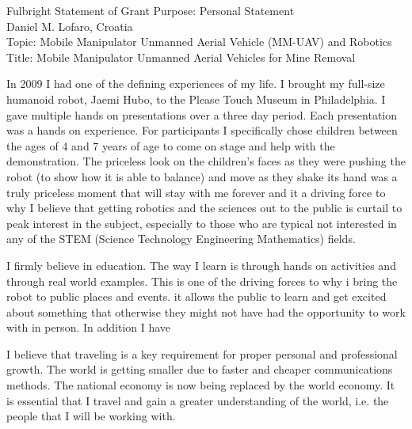 \documentclass[12pt]{article}
\begin{document}
\begin{center}
\Large
Fulbright Statement of Grant Purpose: Personal Statement\\
\large
Daniel M. Lofaro, Croatia\\
Topic: Mobile Manipulator Unmanned Aerial Vehicle (MM-UAV) and Robotics\\
Title: Mobile Manipulator Unmanned Aerial Vehicles for Mine Removal\\

\end{center}

\normalsize
In 2009 I had one of the defining experiences of my life.  I brought my full-size humanoid robot, Jaemi Hubo, to the Please Touch Museum in Philadelphia.  I gave multiple hands on presentations over a three day period.  Each presentation was a hands on experience.  For participants I specifically chose children between the ages of 4 and 7 years of age to come on stage and help with the demonstration.  The priceless look on the children's faces as they were pushing the robot (to show how it is able to balance) and move as they shake its hand was a truly priceless moment that will stay with me forever and it a driving force to why I believe that getting robotics and the sciences out to the public is curtail to peak interest in the subject, especially to those who are typical not interested in any of the STEM (Science Technology Engineering Mathematics) fields.

I firmly believe in education.  The way I learn is through hands on activities and through real world examples.  This is one of the driving forces to why i bring the robot to public places and events.  it allows the public to learn and get excited about something that otherwise they might not have had the opportunity to work with in person.  In addition I have

I believe that traveling is a key requirement for proper personal and professional growth.  The world is getting smaller due to faster and cheaper communications methods.  The national economy is now being replaced by the world economy.  It is essential that I travel and gain a greater understanding of the world, i.e. the people that I will be working with.
\end{document}
